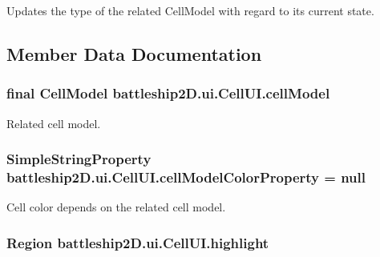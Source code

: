 Updates the type of the related Cell\-Model with regard to its current state. 



\subsection{Member Data Documentation}
\hypertarget{classbattleship2D_1_1ui_1_1CellUI_ae8ba5dba09afebc304ec693a37950cfb}{
\subsubsection[{cell\-Model}]{\setlength{\rightskip}{0pt plus 5cm}final {\bf Cell\-Model} battleship2\-D.\-ui.\-Cell\-U\-I.\-cell\-Model\hspace{0.3cm}{\ttfamily [private]}}}\label{classbattleship2D_1_1ui_1_1CellUI_ae8ba5dba09afebc304ec693a37950cfb}


Related cell model. 

\hypertarget{classbattleship2D_1_1ui_1_1CellUI_a503b29c1a9fb26fb983caebf772c8c90}{
\subsubsection[{cell\-Model\-Color\-Property}]{\setlength{\rightskip}{0pt plus 5cm}Simple\-String\-Property battleship2\-D.\-ui.\-Cell\-U\-I.\-cell\-Model\-Color\-Property = null\hspace{0.3cm}{\ttfamily [private]}}}\label{classbattleship2D_1_1ui_1_1CellUI_a503b29c1a9fb26fb983caebf772c8c90}


Cell color depends on the related cell model. 

\hypertarget{classbattleship2D_1_1ui_1_1CellUI_a8740932a3854223098d31cf94b09f82c}{
\subsubsection[{highlight}]{\setlength{\rightskip}{0pt plus 5cm}Region battleship2\-D.\-ui.\-Cell\-U\-I.\-highlight\hspace{0.3cm}{\ttfamily [private]}}}\label{classbattleship2D_1_1ui_1_1CellUI_a8740932a3854223098d31cf94b09f82c}


